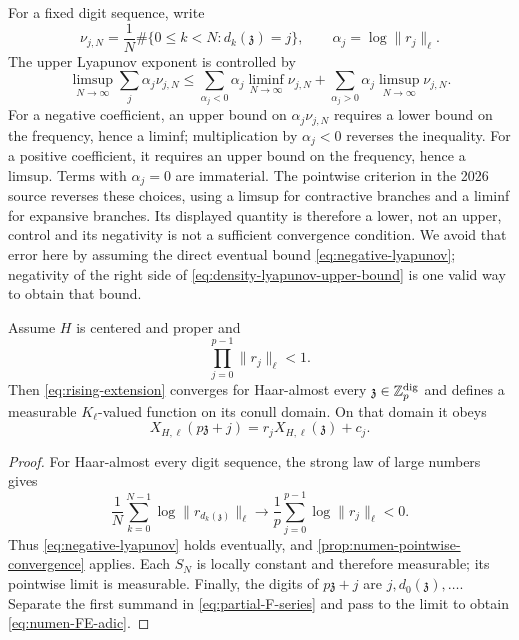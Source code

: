 \begin{sourceissue}
For a fixed digit sequence, write
\[
 \nu_{j,N}=\frac1N\#\{0\leq k<N:d_k(\mathfrak z)=j\},
 \qquad \alpha_j=\log\|r_j\|_\ell.
\]
The upper Lyapunov exponent is controlled by
\begin{equation}
\label{eq:density-lyapunov-upper-bound}
 \limsup_{N\to\infty}\sum_j\alpha_j\nu_{j,N}
 \leq
 \sum_{\alpha_j<0}\alpha_j\liminf_{N\to\infty}\nu_{j,N}
 +\sum_{\alpha_j>0}\alpha_j\limsup_{N\to\infty}\nu_{j,N}.
\end{equation}
For a negative coefficient, an upper bound on $\alpha_j\nu_{j,N}$ requires a
lower bound on the frequency, hence a liminf; multiplication by
$\alpha_j<0$ reverses the inequality.  For a positive coefficient, it
requires an upper bound on the frequency, hence a limsup.  Terms with
$\alpha_j=0$ are immaterial.  The pointwise criterion in the 2026 source
reverses these choices, using a limsup for contractive branches and a liminf
for expansive branches.  Its displayed quantity is therefore a lower, not
an upper, control and its negativity is not a sufficient convergence
condition.  We avoid that error here by assuming the direct eventual bound
\cref{eq:negative-lyapunov}; negativity of the right side of
\cref{eq:density-lyapunov-upper-bound} is one valid way to obtain that bound.
\end{sourceissue}

\begin{theorem}
\label{thm:numen-ae-extension}
Assume $H$ is centered and proper and
\begin{equation}
\label{eq:geometric-mean-contraction}
 \prod_{j=0}^{p-1}\|r_j\|_\ell<1.
\end{equation}
Then \cref{eq:rising-extension} converges for Haar-almost every
$\mathfrak z\in\mathbb Z_p^{\mathrm{dig}}$ and defines a measurable
$K_\ell$-valued function on its conull domain.  On that domain it obeys
\begin{equation}
\label{eq:numen-FE-adic}
 X_{H,\ell}(p\mathfrak z+j)
 =r_jX_{H,\ell}(\mathfrak z)+c_j.
\end{equation}
\end{theorem}

\begin{proof}
For Haar-almost every digit sequence, the strong law of large numbers gives
\[
 \frac1N\sum_{k=0}^{N-1}\log\|r_{d_k(\mathfrak z)}\|_\ell
 \longrightarrow \frac1p\sum_{j=0}^{p-1}\log\|r_j\|_\ell<0.
\]
Thus \cref{eq:negative-lyapunov} holds eventually, and
\cref{prop:numen-pointwise-convergence} applies.  Each $S_N$ is locally
constant and therefore measurable; its pointwise limit is measurable.
Finally, the digits of $p\mathfrak z+j$ are $j,d_0(\mathfrak z),\ldots$.
Separate the first summand in \cref{eq:partial-F-series} and pass to the
limit to obtain \cref{eq:numen-FE-adic}.
\end{proof}


